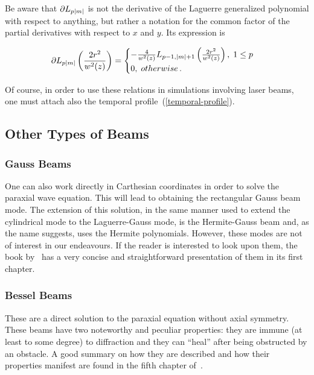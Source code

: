 \documentclass[12pt, class=report, crop=false]{standalone}
\begin{document}
Be aware that \(\partial L_{p\abs{m}}\) is not the derivative of the Laguerre generalized polynomial with respect to anything, but rather a notation for the common factor of the partial derivatives with respect to \(x\) and \(y\). Its expression is

\begin{equation}
  \partial L_{p\abs{m}}\left(\frac{2r^2}{w^2(z)}\right) =
  \begin{cases}
    - \frac{4}{w^2(z)} L_{p-1,\abs{m}+1}\left(\frac{2r^2}{w^2(z)}\right),\; 1\leq p\\
    0,\; otherwise\,.
  \end{cases}
\end{equation}

Of course, in order to use these relations in simulations involving laser beams, one must attach also the temporal profile~(\ref{temporal-profile}).

\subsection{Other Types of Beams}

\subsubsection{Gauss Beams}
One can also work directly in Carthesian coordinates in order to solve the paraxial wave equation. This will lead to obtaining the rectangular Gauss beam mode. The extension of this solution, in the same manner used to extend the cylindrical mode to the Laguerre-Gauss mode, is the Hermite-Gauss beam and, as the name suggests, uses the Hermite polynomials. However, these modes are not of interest in our endeavours. If the reader is interested to look upon them, the book by~\cite{goldsmithQuasiopticalSystemsGaussian1998} has a very concise and straightforward presentation of them in its first chapter.

\subsubsection{Bessel Beams}

These are a direct solution to the paraxial equation without axial symmetry. These beams have two noteworthy and peculiar properties: they are immune (at least to some degree) to diffraction and they can ``heal'' after being obstructed by an obstacle. A good summary on how they are described and how their properties manifest are found in the fifth chapter of~\cite{ssimonGuidedTourLight2016}.
\end{document}
